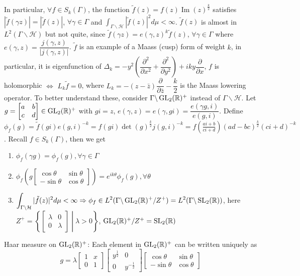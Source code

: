 \documentclass[main]{subfiles}
\begin{document}
In particular, $\forall f\in S_k(\Gamma)$, the function $\tilde f(z)=f(z)\operatorname{Im}(z)^{\frac{k}{2}}$ satisfies $|\tilde f(\gamma z)|=|\tilde f(z)|$, $\forall \gamma\in\Gamma$ and $\displaystyle\int_{\Gamma\backslash\mathcal H}|\tilde f(z)|^2d\mu<\infty$. $\tilde f(z)$ is almost in $L^2(\Gamma\backslash\mathcal H)$ but not quite, since $\tilde f(\gamma z)=e(\gamma,z)^k\tilde f(z)$, $\forall\gamma\in\Gamma$ where $e(\gamma,z)=\dfrac{j(\gamma,z)}{|j(\gamma,z)|}$. $\tilde f$ is an example of a Maass (cusp) form of weight $k$, in particular, it is eigenfunction of $\Delta_k=-y^2\left(\dfrac{\partial^2}{\partial x^2}+\dfrac{\partial^2}{\partial y^2}\right)+iky\dfrac{\partial}{\partial x}$, $f$ is holomorphic $\iff$ $L_k\tilde f=0$, where $L_k=-(z-\bar z)\dfrac{\partial}{\partial \bar z}-\dfrac{k}{2}$ is the Maass lowering operator. To better understand these, consider $\Gamma\backslash\operatorname{GL}_2(\mathbb R)^+$ instead of $\Gamma\backslash\mathcal H$. Let $g=\begin{bmatrix}
a&b\\
c&d
\end{bmatrix}\in\operatorname{GL}_2(\mathbb R)^+$ with $gi=z$, $e(\gamma,z)=e(\gamma,gi)=\dfrac{e(\gamma g,i)}{e(g,i)}$. Define $\phi_f(g)=\tilde f(gi)e(g,i)^{-k}=f(gi)\det(g)^{\frac{k}{2}}j(g,i)^{-k}=f(\frac{ai+b}{ci+d})(ad-bc)^{\frac{k}{2}}(ci+d)^{-k}$. Recall $f\in S_k(\Gamma)$, then we get
\begin{enumerate}
\item $\phi_f(\gamma g)=\phi_f(g),\forall\gamma\in\Gamma$
\item $\phi_f\left(g\begin{bmatrix}
\cos\theta&\sin\theta \\
-\sin\theta&\cos\theta
\end{bmatrix}\right)=e^{ik\theta}\phi_f(g),\forall \theta$
\item $\displaystyle\int_{\Gamma\backslash\mathcal H}|\tilde f(z)|^2d\mu<\infty\Rightarrow \phi_f\in L^2(\Gamma\backslash\operatorname{GL}_2(\mathbb R)^+/Z^+)=L^2(\Gamma\backslash\operatorname{SL}_2(\mathbb R))$, here $Z^+=\left\{\begin{bmatrix}
\lambda&0 \\
0&\lambda
\end{bmatrix}\middle|\lambda>0\right\}$, $\operatorname{GL}_2(\mathbb R)^+/Z^+=\operatorname{SL}_2(\mathbb R)$
\end{enumerate}
Haar measure on $\operatorname{GL}_2(\mathbb R)^+$: Each element in $\operatorname{GL}_2(\mathbb R)^+$ can be written uniquely as
\[g=\lambda\begin{bmatrix}
1&x \\
0&1
\end{bmatrix}\begin{bmatrix}
y^{\frac{1}{2}}&0 \\
0&y^{-\frac{1}{2}}
\end{bmatrix}\begin{bmatrix}
\cos\theta&\sin\theta \\
-\sin\theta&\cos\theta
\end{bmatrix}\]
\end{document}
